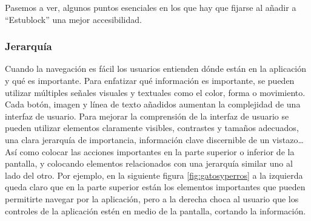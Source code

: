 Pasemos a ver, algunos puntos esenciales en los que hay que fijarse al añadir a ``Estublock'' una mejor accesibilidad.

\subsubsection{Jerarquía}
Cuando la navegación es fácil los usuarios entienden dónde están en la aplicación y qué es importante. Para enfatizar qué información es importante, se pueden utilizar múltiples señales visuales y textuales como el color, forma o movimiento. Cada botón, imagen y línea de texto añadidos aumentan la complejidad de una interfaz de usuario. Para mejorar la comprensión de la interfaz de usuario se pueden utilizar elementos claramente visibles, contrastes y tamaños adecuados, una clara jerarquía de importancia, información clave discernible de un vistazo\dots Así como colocar las acciones importantes en la parte superior o inferior de la pantalla, y colocando elementos relacionados con una jerarquía similar uno al lado del otro. Por ejemplo, en la siguiente figura \ref{fig:gatosyperros} a la izquierda queda claro que en la parte superior están los elementos importantes que pueden permitirte navegar por la aplicación, pero a la derecha choca al usuario que los controles de la aplicación estén en medio de la pantalla, cortando la información. 

